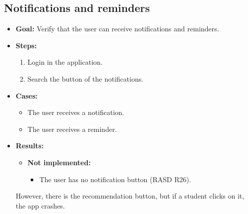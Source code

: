 \subsection{Notifications and reminders}
\begin{itemize}
    \item \textbf{Goal:} Verify that the user can receive notifications and reminders.

    \item \textbf{Steps:}
    \begin{enumerate}
        \item Login in the application.
        \item Search the button of the notifications.
    \end{enumerate}
    \item \textbf{Cases:}
    \begin{itemize}
        \item The user receives a notification.
        \item The user receives a reminder.
    \end{itemize}
    \item \textbf{Results:}
    \begin{itemize}
        \item \textbf{Not implemented:}
        \begin{itemize}
            \item The user has no notification button (RASD R26).
        \end{itemize}
    \end{itemize}

    However, there is the recommendation button, but if a student clicks on it, the app crashes.

\end{itemize}


